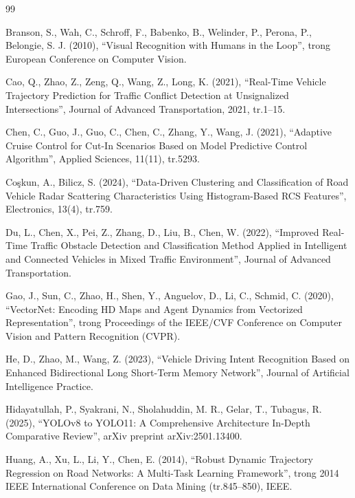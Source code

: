 \begingroup
\renewcommand{\section}[2]{}  
\begin{thebibliography}{99}

Branson, S., Wah, C., Schroff, F., Babenko, B., Welinder, P., Perona, P., Belongie, S. J. (2010), 
“Visual Recognition with Humans in the Loop”, 
trong European Conference on Computer Vision.

Cao, Q., Zhao, Z., Zeng, Q., Wang, Z., Long, K. (2021), 
“Real-Time Vehicle Trajectory Prediction for Traffic Conflict Detection at Unsignalized Intersections”, 
Journal of Advanced Transportation, 2021, tr.1--15.

Chen, C., Guo, J., Guo, C., Chen, C., Zhang, Y., Wang, J. (2021), 
“Adaptive Cruise Control for Cut-In Scenarios Based on Model Predictive Control Algorithm”, 
Applied Sciences, 11(11), tr.5293.

Co{\c{s}}kun, A., Bilicz, S. (2024), 
“Data-Driven Clustering and Classification of Road Vehicle Radar Scattering Characteristics Using Histogram-Based RCS Features”, 
Electronics, 13(4), tr.759.

Du, L., Chen, X., Pei, Z., Zhang, D., Liu, B., Chen, W. (2022), 
“Improved Real-Time Traffic Obstacle Detection and Classification Method Applied in Intelligent and Connected Vehicles in Mixed Traffic Environment”, 
Journal of Advanced Transportation.

Gao, J., Sun, C., Zhao, H., Shen, Y., Anguelov, D., Li, C., Schmid, C. (2020), 
“VectorNet: Encoding HD Maps and Agent Dynamics from Vectorized Representation”, 
trong Proceedings of the IEEE/CVF Conference on Computer Vision and Pattern Recognition (CVPR).

He, D., Zhao, M., Wang, Z. (2023), 
“Vehicle Driving Intent Recognition Based on Enhanced Bidirectional Long Short-Term Memory Network”, 
Journal of Artificial Intelligence Practice.

Hidayatullah, P., Syakrani, N., Sholahuddin, M. R., Gelar, T., Tubagus, R. (2025), 
“YOLOv8 to YOLO11: A Comprehensive Architecture In-Depth Comparative Review”, 
arXiv preprint arXiv:2501.13400.

Huang, A., Xu, L., Li, Y., Chen, E. (2014), 
“Robust Dynamic Trajectory Regression on Road Networks: A Multi-Task Learning Framework”, 
trong 2014 IEEE International Conference on Data Mining (tr.845--850), IEEE.


\end{thebibliography}
